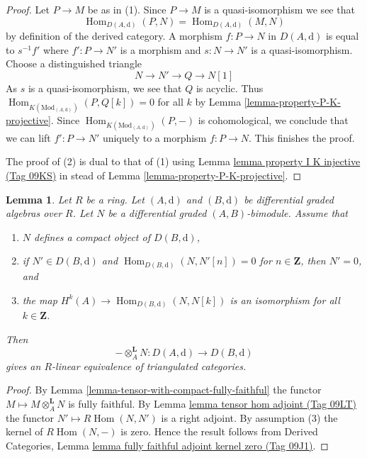 \documentclass{amsart}
\theoremstyle{plain}
\newtheorem{lemma}[subsection]{Lemma}
\theoremstyle{definition}
\theoremstyle{remark}
\numberwithin{equation}{subsection}
\def\Hom{\mathop{\mathrm{Hom}}\nolimits}
\begin{document}
\begin{proof}
Let $P \to M$ be as in (1). Since $P \to M$ is a quasi-isomorphism we see that
$$
\Hom_{D(A, \text{d})}(P, N) = \Hom_{D(A, \text{d})}(M, N)
$$
by definition of the derived category. A morphism
$f : P \to N$ in $D(A, \text{d})$ is equal to
$s^{-1}f'$ where $f' : P \to N'$ is a morphism and
$s : N \to N'$ is a quasi-isomorphism. Choose a distinguished triangle
$$
N \to N' \to Q \to N[1]
$$
As $s$ is a quasi-isomorphism, we see that $Q$ is acyclic. Thus
$\Hom_{K(\text{Mod}_{(A, \text{d})})}(P, Q[k]) = 0$ for all $k$ by
Lemma \ref{lemma-property-P-K-projective}. Since
$\Hom_{K(\text{Mod}_{(A, \text{d})})}(P, -)$
is cohomological, we conclude that we can lift $f' : P \to N'$
uniquely to a morphism $f : P \to N$. This finishes the proof.

\medskip\noindent
The proof of (2) is dual to that of (1) using
Lemma \href{https://stacks.math.columbia.edu/tag/09KS}{lemma property I K injective (Tag 09KS)} in stead of
Lemma \ref{lemma-property-P-K-projective}.
\end{proof}


\begin{lemma}
\label{lemma-tilting-equivalence}
Let $R$ be a ring. Let $(A, \text{d})$ and $(B, \text{d})$ be 
differential graded algebras over $R$. Let $N$ be a
differential graded $(A, B)$-bimodule. Assume that
\begin{enumerate}
\item $N$ defines a compact object of $D(B, \text{d})$,
\item if $N' \in D(B, \text{d})$ and
$\Hom_{D(B, \text{d})}(N, N'[n]) = 0$ for $n \in \mathbf{Z}$,
then $N' = 0$, and
\item the map $H^k(A) \to \Hom_{D(B, \text{d})}(N, N[k])$ is an
isomorphism for all $k \in \mathbf{Z}$.
\end{enumerate}
Then
$$
- \otimes_A^\mathbf{L} N : D(A, \text{d}) \to D(B, \text{d})
$$
gives an $R$-linear equivalence of triangulated categories.
\end{lemma}

\begin{proof}
By Lemma \ref{lemma-tensor-with-compact-fully-faithful}
the functor $M \longmapsto M \otimes_A^\mathbf{L} N$ is
fully faithful. By Lemma \href{https://stacks.math.columbia.edu/tag/09LT}{lemma tensor hom adjoint (Tag 09LT)}
the functor $N' \longmapsto R\Hom(N, N')$ is a right adjoint.
By assumption (3) the kernel of $R\Hom(N, -)$ is zero.
Hence the result follows from
Derived Categories, Lemma
\href{https://stacks.math.columbia.edu/tag/09J1}{lemma fully faithful adjoint kernel zero (Tag 09J1)}.
\end{proof}
\end{document}
